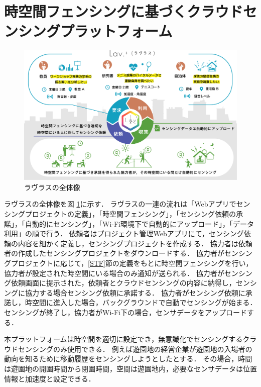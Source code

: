 \section{時空間フェンシングに基づくクラウドセンシングプラットフォーム}

\begin{figure}[tbh]
    \centering
    \includegraphics[width=16cm]{img_lavlus.png}
    \caption{ラヴラスの全体像}
    \label{fig:lavlus}
\end{figure}

ラヴラスの全体像を図 \ref{fig:lavlus}に示す．
ラヴラスの一連の流れは「Webアプリでセンシングプロジェクトの定義」，「時空間フェンシング」，「センシング依頼の承諾」，「自動的にセンシング」，「Wi-Fi環境下で自動的にアップロード」，「データ利用」の順で行う．
依頼者はプロジェクト管理Webアプリにて，センシング依頼の内容を細かく定義し，センシングプロジェクトを作成する．
協力者は依頼者の作成したセンシングプロジェクトをダウンロードする．
協力者がセンシングプロジェクトに応じて，\ref{STF}節の定義をもとに時空間フェンシングを行い，協力者が設定された時空間にいる場合のみ通知が送られる．
協力者がセンシング依頼画面に提示された，依頼者とクラウドセンシングの内容に納得し，センシングに協力する場合センシング依頼に承諾する．
協力者がセンシング依頼に承諾し，時空間に進入した場合，バックグラウンドで自動でセンシングが始まる．
センシングが終了し，協力者がWi-Fi下の場合，センサデータをアップロードする．

本プラットフォームは時空間を適切に設定でき，無意識化でセンシングするクラウドセンシングのみ使用できる．
例えば遊園地の経営企業が遊園地の入場者の動向を知るために移動履歴をセンシングしようとしたとする．
その場合，時間は遊園地の開園時間から閉園時間，空間は遊園地内，必要なセンサデータは位置情報と加速度と設定できる．




